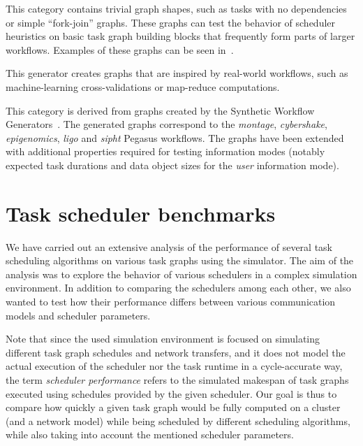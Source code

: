 \begin{description}[wide=0pt]
	\item[elementary] This category contains trivial graph shapes, such as tasks with no dependencies or simple
		``fork-join'' graphs. These graphs can test the behavior of scheduler heuristics on basic task
		graph building blocks that frequently form parts of larger workflows. Examples of these graphs can
		be seen in~.

	\item[irw] This generator creates graphs that are inspired by real-world workflows, such as machine-learning
		cross-validations or map-reduce computations.

	\item[pegasus] This category is derived from graphs created by the Synthetic Workflow
		Generators~\cite{pegasusgraphs}. The generated graphs correspond to the \emph{montage},
		\emph{cybershake}, \emph{epigenomics}, \emph{ligo} and \emph{sipht}
		Pegasus workflows. The graphs have been extended with additional properties required for testing
		information modes (notably expected task durations and data object sizes for the
		\emph{user} information mode).
\end{description}

\section{Task scheduler benchmarks}
\label{sec:estee-benchmarks}
We have carried out an extensive analysis of the performance of several task scheduling algorithms
on various task graphs using the \estee{} simulator. The aim of the analysis was to
explore the behavior of various schedulers in a complex simulation environment. In addition to
comparing the schedulers among each other, we also wanted to test how their performance differs
between various communication models and scheduler parameters.

Note that since the used simulation environment is focused on simulating different task graph
schedules and network transfers, and it does not model the actual execution of the scheduler nor
the task runtime in a cycle-accurate way, the term \emph{scheduler performance} refers to the simulated
makespan of task graphs executed using schedules provided by the given scheduler. Our goal is thus
to compare how quickly a given task graph would be fully computed on a cluster (and a network
model) while being scheduled by different scheduling algorithms, while also taking into account the
mentioned scheduler parameters.

